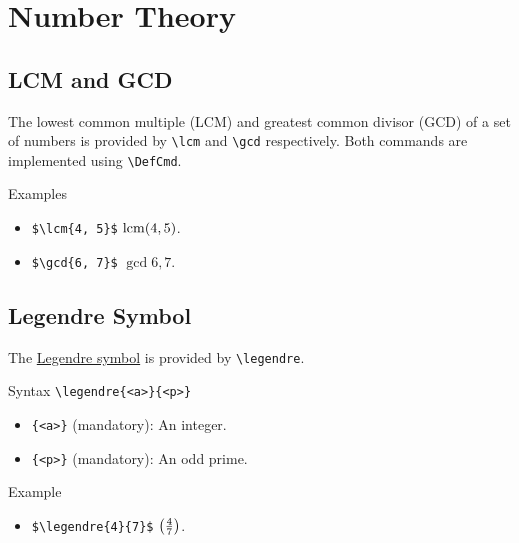 \section{Number Theory}

\subsection{LCM and GCD}

The lowest common multiple (LCM) and greatest common divisor (GCD) of a set of numbers is provided by \verb|\lcm| and \verb|\gcd| respectively. Both commands are implemented using \verb|\DefCmd|.

\begin{myframe}{Examples}
    \begin{itemize}
        \item \verb|$\lcm{4, 5}$| \produces{} $\lcm{4, 5}$.
        \item \verb|$\gcd{6, 7}$| \produces{} $\gcd{6, 7}$.
    \end{itemize}
\end{myframe}

\subsection{Legendre Symbol}

The \href{https://mathworld.wolfram.com/LegendreSymbol.html}{Legendre symbol} is provided by \verb|\legendre|.

\begin{myframe}{Syntax}
    \verb|\legendre{<a>}{<p>}|
    \begin{itemize}
        \item \verb|{<a>}| (mandatory): An integer.
        \item \verb|{<p>}| (mandatory): An odd prime.
    \end{itemize}
\end{myframe}

\begin{myframe}{Example}
    \begin{itemize}
        \item \verb|$\legendre{4}{7}$| \produces{} $\left( \frac{4}{7} \right)$.
    \end{itemize}
\end{myframe}